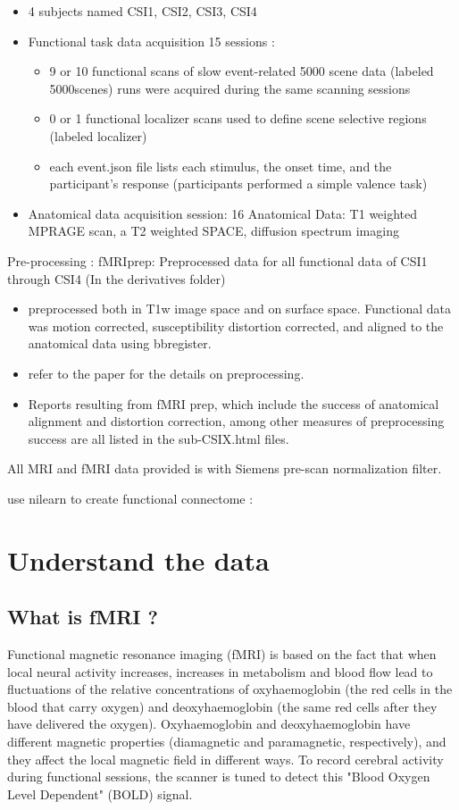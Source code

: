 \documentclass[12pt]{article}
\begin{document}
\begin{itemize}
    \item 4 subjects named CSI1, CSI2, CSI3, CSI4
    \item Functional task data acquisition 15 sessions : 
        \begin{itemize}
            \item 9 or 10 functional scans of slow event-related 5000 scene data (labeled 5000scenes) runs were acquired during the same scanning sessions
            \item 0 or 1 functional localizer scans used to define scene selective regions (labeled localizer)
            \item each event.json file lists each stimulus, the onset time, and the participant’s response (participants performed a simple valence task)
        \end{itemize}
    \item Anatomical data acquisition session: 16 Anatomical Data: T1 weighted MPRAGE scan, a T2 weighted SPACE, diffusion spectrum imaging
\end{itemize}
Pre-processing : fMRIprep: Preprocessed data for all functional data of CSI1 through CSI4 (In the derivatives folder)
\begin{itemize}
    \item preprocessed both in T1w image space and on surface space. Functional data was motion corrected, susceptibility distortion corrected, and aligned to the anatomical data using bbregister.
    \item refer to the paper for the details on preprocessing.
    \item Reports resulting from fMRI prep, which include the success of anatomical alignment and distortion correction, among other measures of preprocessing success are all listed in the sub-CSIX.html files.
\end{itemize}
All MRI and fMRI data provided is with Siemens pre-scan normalization filter.


use nilearn to create functional connectome : %

\section{Understand the data}
\subsection{What is fMRI ?}
Functional magnetic resonance imaging (fMRI) is based on the fact that when local neural activity increases, increases in metabolism and blood flow lead to fluctuations of the relative concentrations of oxyhaemoglobin (the red cells in the blood that carry oxygen) and deoxyhaemoglobin (the same red cells after they have delivered the oxygen). 
Oxyhaemoglobin and deoxyhaemoglobin have different magnetic properties (diamagnetic and paramagnetic, respectively), and they affect the local magnetic field in different ways.
To record cerebral activity during functional sessions, the scanner is tuned to detect this "Blood Oxygen Level Dependent" (BOLD) signal. \\ 
\end{document}
